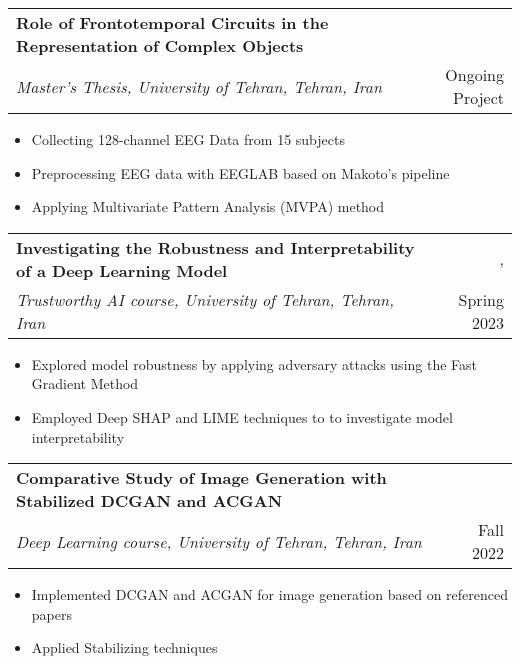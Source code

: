 \documentclass[a4paper,11pt]{article}
\makeatletter
\newcommand{\resumeSubheading}[4]{
\vspace{0.5mm}\item
    \begin{tabular*}{0.98\textwidth}[t]{l@{\extracolsep{\fill}}r}
        \textbf{#1} & \textit{\footnotesize{#4}} \\
        \textit{\footnotesize{#3}} &  \footnotesize{#2}\\
    \end{tabular*}
    \vspace{-2.4mm}
}
\newcommand{\resumeItemListStart}{\begin{justify}\begin{itemize}[leftmargin=3ex, rightmargin=2ex, noitemsep,labelsep=1.2mm,itemsep=0mm]\small}
\newcommand{\resumeItemListEnd}{\end{itemize}\end{justify}\vspace{-2mm}}
\makeatother
\begin{document}
\resumeSubheading
      {Role of Frontotemporal Circuits in the Representation of Complex Objects}{Ongoing Project}{Master's Thesis, University of Tehran, Tehran, Iran}{}
      \vspace{-1.0mm}
      \resumeItemListStart
    \item {Collecting 128-channel EEG Data from 15 subjects}
    \item {Preprocessing EEG data with EEGLAB based on Makoto's pipeline}
    \item {Applying Multivariate Pattern Analysis (MVPA) method}
    \resumeItemListEnd
    \vspace{-3.0mm}

    \resumeSubheading
      {Investigating the Robustness and Interpretability of a Deep Learning Model}{Spring 2023}{Trustworthy AI course, University of Tehran, Tehran, Iran}{\href{https://github.com/SaraRostami/University/tree/63b8ca39f91fefc349b1b93c570c8de36243c48c/Trustworthy\%20AI\%20-\%20Spring\%202023/HW1_TAI}{\color{cyan}{ \underline{link}}},\href{https://github.com/SaraRostami/University/tree/63b8ca39f91fefc349b1b93c570c8de36243c48c/Trustworthy\%20AI\%20-\%20Spring\%202023/HW2_TAI}{\color{cyan}{ \underline{link}}}}
      \vspace{-1.0mm}
      \resumeItemListStart
    \item {Explored model robustness by applying adversary attacks using the Fast Gradient Method}
    \item {Employed Deep SHAP and LIME techniques to to investigate model interpretability}
    \resumeItemListEnd
    \vspace{-3.0mm}

    \resumeSubheading
      {Comparative Study of Image Generation with Stabilized DCGAN and ACGAN}{Fall 2022}{Deep Learning course, University of Tehran, Tehran, Iran}{\href{https://github.com/SaraRostami/University/tree/main/Neural\%20Networks\%20-\%20Fall\%202022/Assignments/NNDL-HW6}{\color{cyan}{ \underline{link}}}}
      \vspace{-1.0mm}
      \resumeItemListStart
    \item {Implemented DCGAN and ACGAN for image generation based on referenced papers}
    \item {Applied Stabilizing techniques}
    \resumeItemListEnd
    \vspace{-3.0mm}
    
\end{document}
